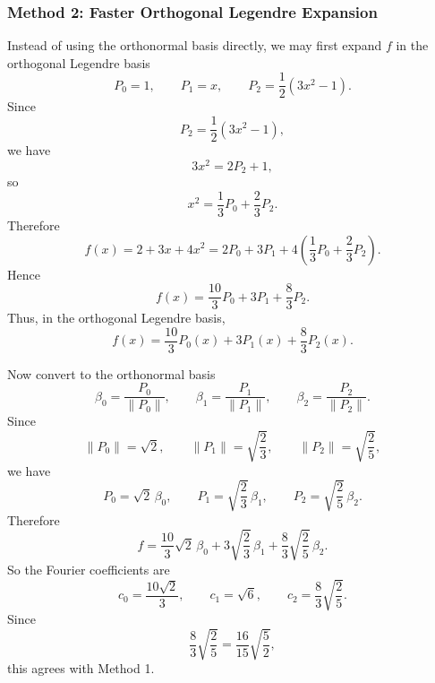\documentclass[12pt]{article}
\begin{document}
\newpage
\subsubsection{Method 2: Faster Orthogonal Legendre Expansion}

Instead of using the orthonormal basis directly, we may first expand $f$ in the
orthogonal Legendre basis
\[
  P_0=1,
  \qquad
  P_1=x,
  \qquad
  P_2=\frac12(3x^2-1).
\]
Since
\[
  P_2=\frac12(3x^2-1),
\]
we have
\[
  3x^2=2P_2+1,
\]
so
\[
  x^2=\frac13P_0+\frac23P_2.
\]
Therefore
\[
  f(x)=2+3x+4x^2
  =
  2P_0+3P_1+4\left(\frac13P_0+\frac23P_2\right).
\]
Hence
\[
  f(x)
  =
  \frac{10}{3}P_0+3P_1+\frac83P_2.
\]
Thus, in the orthogonal Legendre basis,
\[
  \boxed{
  f(x)=\frac{10}{3}P_0(x)+3P_1(x)+\frac83P_2(x).}
\]

Now convert to the orthonormal basis
\[
  \beta_0=\frac{P_0}{\|P_0\|},
  \qquad
  \beta_1=\frac{P_1}{\|P_1\|},
  \qquad
  \beta_2=\frac{P_2}{\|P_2\|}.
\]
Since
\[
  \|P_0\|=\sqrt2,
  \qquad
  \|P_1\|=\sqrt{\frac23},
  \qquad
  \|P_2\|=\sqrt{\frac25},
\]
we have
\[
  P_0=\sqrt2\,\beta_0,
  \qquad
  P_1=\sqrt{\frac23}\,\beta_1,
  \qquad
  P_2=\sqrt{\frac25}\,\beta_2.
\]
Therefore
\[
  f
  =
  \frac{10}{3}\sqrt2\,\beta_0
  +
  3\sqrt{\frac23}\,\beta_1
  +
  \frac83\sqrt{\frac25}\,\beta_2.
\]
So the Fourier coefficients are
\[
  \boxed{
  c_0=\frac{10\sqrt2}{3},
  \qquad
  c_1=\sqrt6,
  \qquad
  c_2=\frac83\sqrt{\frac25}.}
\]
Since
\[
  \frac83\sqrt{\frac25}
  =
  \frac{16}{15}\sqrt{\frac52},
\]
this agrees with Method 1.
\end{document}
